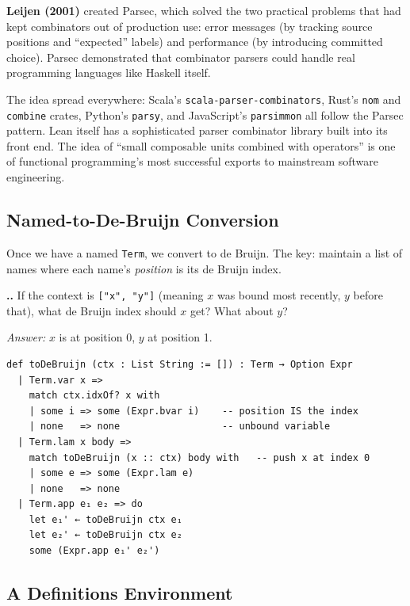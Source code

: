 \documentclass[11pt,a4paper]{article}
\newcounter{exercise}[section]
\renewcommand{\theexercise}{\thesection.\arabic{exercise}}
\theoremstyle{definition}
\begin{document}
\textbf{Leijen (2001)} created Parsec, which solved the two practical problems
that had kept combinators out of production use: error messages (by tracking
source positions and ``expected'' labels) and performance (by introducing
committed choice). Parsec demonstrated that combinator parsers could handle
real programming languages like Haskell itself.

The idea spread everywhere: Scala's \texttt{scala-parser-combinators}, Rust's
\texttt{nom} and \texttt{combine} crates, Python's \texttt{parsy}, and
JavaScript's \texttt{parsimmon} all follow the Parsec pattern. Lean itself has
a sophisticated parser combinator library built into its front end. The idea
of ``small composable units combined with operators'' is one of functional
programming's most successful exports to mainstream software engineering.

\subsection{Named-to-De-Bruijn Conversion}

Once we have a named \texttt{Term}, we convert to de Bruijn. The key: maintain
a list of names where each name's \emph{position} is its de Bruijn index.

\begin{exercisebox}
\textbf{\theexercise.}\; If the context is \texttt{["x", "y"]} (meaning $x$ was bound most recently, $y$ before that), what de Bruijn index should $x$ get? What about $y$?

\emph{Answer:} $x$ is at position 0, $y$ at position 1.
\end{exercisebox}

\begin{verbatim}
def toDeBruijn (ctx : List String := []) : Term → Option Expr
  | Term.var x =>
    match ctx.idxOf? x with
    | some i => some (Expr.bvar i)    -- position IS the index
    | none   => none                  -- unbound variable
  | Term.lam x body =>
    match toDeBruijn (x :: ctx) body with   -- push x at index 0
    | some e => some (Expr.lam e)
    | none   => none
  | Term.app e₁ e₂ => do
    let e₁' ← toDeBruijn ctx e₁
    let e₂' ← toDeBruijn ctx e₂
    some (Expr.app e₁' e₂')
\end{verbatim}

\subsection{A Definitions Environment}
\end{document}
